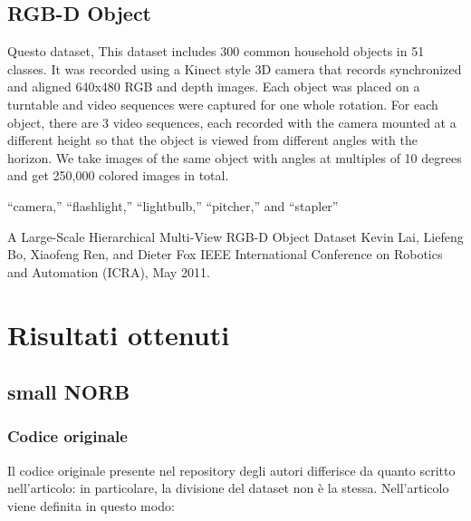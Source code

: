 \documentclass[italian,12pt,a4paper,oneside,final]{report}
\begin{document}
\subsection{RGB-D Object}
Questo dataset\cite{dataset:rgb-d},
This dataset includes 300 common household objects in 51
classes. It was recorded using a Kinect style 3D camera that records synchronized and aligned
640x480 RGB and depth images. Each object was placed on a turntable and video sequences were
captured for one whole rotation. For each object, there are 3 video sequences, each recorded with
the camera mounted at a different height so that the object is viewed from different angles with the
horizon. We take images of the same object with angles at multiples of 10 degrees and get 250,000
colored images in total.

“camera,” “flashlight,” “lightbulb,” “pitcher,” and “stapler”

A Large-Scale Hierarchical Multi-View RGB-D Object Dataset 
Kevin Lai, Liefeng Bo, Xiaofeng Ren, and Dieter Fox 
IEEE International Conference on Robotics and Automation (ICRA), May 2011.

\section{Risultati ottenuti}

\subsection{small NORB}

\subsubsection{Codice originale}
Il codice originale presente nel repository degli autori differisce da quanto scritto nell'articolo: in particolare, la divisione del dataset non è la stessa.
Nell'articolo viene definita in questo modo:
\end{document}
